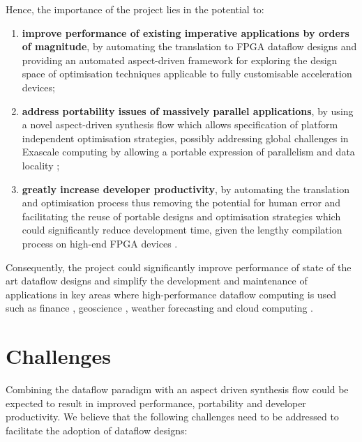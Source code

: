 Hence, the importance of the project lies in the potential to:
\begin{enumerate}
\item \textbf{improve performance of existing imperative applications
  by orders of magnitude}, by automating the translation to FPGA
  dataflow designs and providing an automated aspect-driven framework
  for exploring the design space of optimisation techniques applicable
  to fully customisable acceleration devices;

\item \textbf{address portability issues of massively parallel
  applications}, by using a novel aspect-driven synthesis flow which
  allows specification of platform independent optimisation
  strategies, possibly addressing global challenges in Exascale
  computing by allowing a portable expression of parallelism and data
  locality \cite[pp. 46 -- 50]{amarasinghe2009exascale};

\item \textbf{greatly increase developer productivity}, by automating
  the translation and optimisation process thus removing the potential
  for human error and facilitating the reuse of portable designs and
  optimisation strategies which could significantly reduce development
  time, given the lengthy compilation process on high-end FPGA devices
  \cite[pp. 23 -- 28]{Chen:Cong:Pan}.
\end{enumerate}

Consequently, the project could significantly improve performance of
state of the art dataflow designs and simplify the development and
maintenance of applications in key areas where high-performance
dataflow computing is used such as finance \cite{6339256,
  Weston:Martin:Spooner:Pell:Mencer:2010}, geoscience \cite{6226384},
weather forecasting \cite{Oriato:Tilbury:Marrocu:Pusceddu:2012} and
cloud computing \cite{710029}.

\section{Challenges}

\label{sec:intro-challenges}

Combining the dataflow paradigm with an aspect driven synthesis
flow could be expected to result in improved performance, portability
and developer productivity.  We believe that the following challenges
need to be addressed to facilitate the adoption of dataflow designs:

